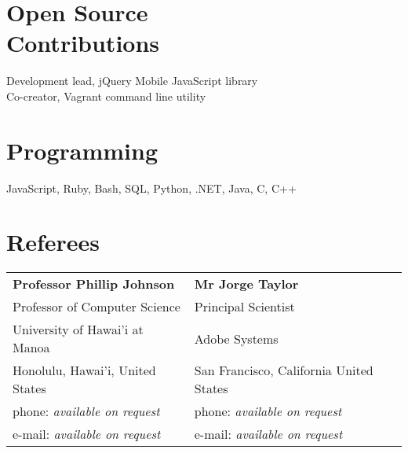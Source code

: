 \documentclass[margin,line]{resume}
\begin{document}
\begin{resume}
    \section{\mysidestyle Open Source\\Contributions}

    Development lead, jQuery Mobile JavaScript library
    \vspace{1mm}\\
    Co-creator, Vagrant command line utility
    \vspace{1mm}\\

    \section{\mysidestyle Programming}

    JavaScript, Ruby, Bash, SQL, Python, .NET, Java, C, C++

\section{\mysidestyle Referees}

\begin{tabular}{@{}p{6cm}p{6cm}}
\textbf{Professor Phillip Johnson}      &  \textbf{Mr Jorge Taylor }                \\
Professor of Computer Science           &  Principal Scientist                      \\
University of Hawai'i at Manoa          &  Adobe Systems                            \\
Honolulu, Hawai'i, United States        &  San Francisco, California United States  \\
phone: \textsl{available on request}    &  phone: \textsl{available on request}     \\
e-mail: \textsl{available on request}   &  e-mail: \textsl{available on request}    \\
\end{tabular}


\end{resume}
\end{document}
